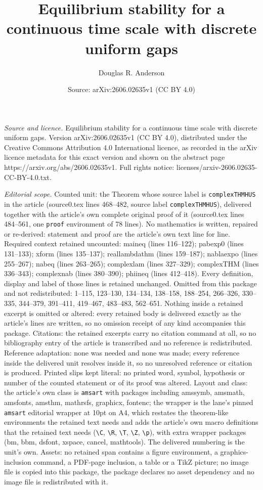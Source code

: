 \documentclass[10pt,a4paper]{amsart}
\title[Equilibrium stability for a continuous time scale with discr]{Equilibrium stability for a continuous time scale with discrete uniform gaps}
\author{Douglas R. Anderson}
\date{Source: arXiv:2606.02635v1 (CC BY 4.0)}
\begin{document}
\maketitle

\noindent\emph{Source and licence.} Equilibrium stability for a continuous time scale with discrete uniform gaps. Version arXiv:2606.02635v1 (CC BY 4.0), distributed under the Creative Commons Attribution 4.0 International licence, as recorded in the arXiv licence metadata for this exact version and shown on the abstract page https://arxiv.org/abs/2606.02635v1. Full rights notice: licenses/arxiv-2606.02635-CC-BY-4.0.txt.\par\smallskip

\noindent\textit{Editorial scope.} Counted unit: the Theorem whose source label is \texttt{complexTHMHUS} in the article (source0.tex lines 468--482, source label \texttt{complexTHMHUS}), delivered together with the article's own complete original proof of it (source0.tex lines 484--561, one \texttt{proof} environment of 78 lines). No mathematics is written, repaired or re-derived: statement and proof are the article's own text line for line. Required context retained uncounted: maineq (lines 116--122); pabexp0 (lines 131--133); xform (lines 135--137); reallambdathm (lines 159--187); nablaexpo (lines 255--267); nabeq (lines 263--265); complexlam (lines 327--329); complexTHM (lines 336--343); complexnab (lines 380--390); phiineq (lines 412--418). Every definition, display and label of those lines is retained unchanged. Omitted from this package and not redistributed: 1--115, 123--130, 134--134, 138--158, 188--254, 266--326, 330--335, 344--379, 391--411, 419--467, 483--483, 562--651. Nothing inside a retained excerpt is omitted or altered: every retained body is delivered exactly as the article's lines are written, so no omission receipt of any kind accompanies this package. Citations: the retained excerpts carry no citation command at all, so no bibliography entry of the article is transcribed and no reference is redistributed. Reference adaptation: none was needed and none was made; every reference inside the delivered unit resolves inside it, so no unresolved reference or citation is produced. Printed slips kept literal: no printed word, symbol, hypothesis or number of the counted statement or of its proof was altered. Layout and class: the article's own class is \texttt{amsart} with packages including amssymb, amsmath, amsfonts, amsthm, mathrsfs, graphicx, fontenc; the wrapper is the lane's pinned \texttt{amsart} editorial wrapper at 10pt on A4, which restates the theorem-like environments the retained text needs and adds the article's own macro definitions that the retained text needs (\texttt{\textbackslash C}, \texttt{\textbackslash R}, \texttt{\textbackslash T}, \texttt{\textbackslash Z}, \texttt{\textbackslash p}), with extra wrapper packages (bm, bbm, dsfont, xspace, cancel, mathtools). The delivered numbering is the unit's own. Assets: no retained span contains a figure environment, a graphics-inclusion command, a PDF-page inclusion, a table or a TikZ picture; no image file is copied into this package, the package declares no asset dependency and no image file is redistributed with it. 
\end{document}
